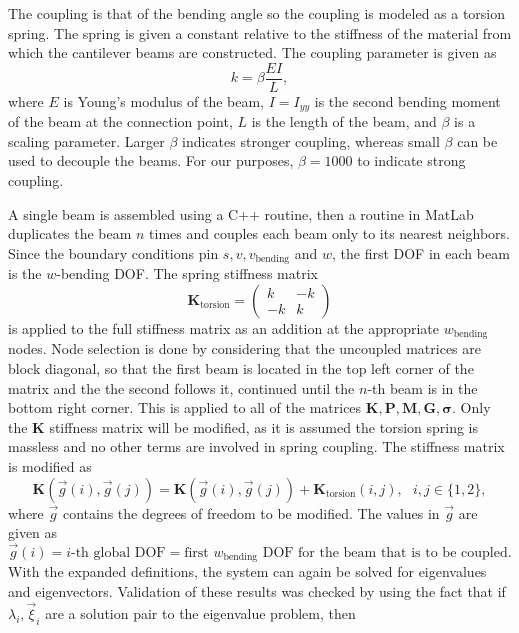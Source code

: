 The coupling is that of the bending angle so the coupling is modeled as a torsion spring. The spring is given a constant relative to the stiffness of the material from which the cantilever beams are constructed. The coupling parameter is given as
\begin{equation}
k = \beta\frac{EI}{L},
\end{equation}
where $E$ is Young's modulus of the beam, $I=I_{yy}$ is the second bending moment of the beam at the connection point, $L$ is the length of the beam, and $\beta$ is a scaling parameter. Larger $\beta$ indicates stronger coupling, whereas small $\beta$ can be used to decouple the beams. For our purposes, $\beta=1000$ to indicate strong coupling.

A single beam is assembled using a C++ routine, then a routine in MatLab duplicates the beam $n$ times and couples each beam only to its nearest neighbors. Since the boundary conditions pin $s,v,v_{\text{bending}}$ and $w$, the first DOF in each beam is the $w$-bending DOF. The spring stiffness matrix
\begin{equation}
\textbf{K}_{\text{torsion}} = 
\begin{pmatrix}
 k & -k \\
-k &  k
\end{pmatrix}
\end{equation}
is applied to the full stiffness matrix as an addition at the appropriate $w_{\text{bending}}$ nodes. Node selection is done by considering that the uncoupled matrices are block diagonal, so that the first beam is located in the top left corner of the matrix and the the second follows it, continued until the $n$-th beam is in the bottom right corner. This is applied to all of the matrices $\mathbf K,\mathbf P,\mathbf M,\mathbf G,\mathbf \sigma$. Only the $\mathbf K$ stiffness matrix will be modified, as it is assumed the torsion spring is massless and no other terms are involved in spring coupling. The stiffness matrix is modified as
\begin{equation}
\mathbf K(\vec g(i),\vec g(j)) = \mathbf K(\vec g(i),\vec g(j))+\mathbf K_{\text{torsion}}(i,j),\text{ }i,j\in\{1,2\},
\end{equation}
where $\vec g$ contains the degrees of freedom to be modified. The values in $\vec g$ are given as
\begin{equation}
\vec g(i) = i\text{-th global DOF} = \text{first }w_{\text{bending}}\text{ DOF for the beam that is to be coupled.}
\end{equation}
With the expanded definitions, the system can again be solved for eigenvalues and eigenvectors. Validation of these results was checked by using the fact that if $\lambda_i,\vec\xi_i$ are a solution pair to the eigenvalue problem, then 
